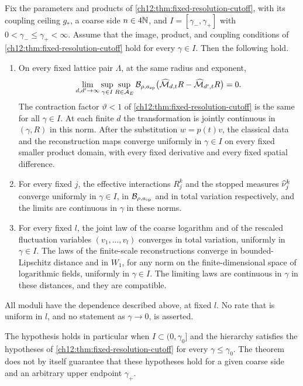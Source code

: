 \begin{theorem}\label{ch12:lem:finite-ceiling-compact-prefixes}\label{ch12:lem:compact-coupling-operators}\label{ch12:thm:compact-coupling-prefixes}
Fix the parameters and products of \cref{ch12:thm:fixed-resolution-cutoff}, with its coupling ceiling $g_*$, a coarse side $n\in4\mathbb N$, and $I=[\gamma_-,\gamma_+]$ with $0<\gamma_-\le\gamma_+<\infty$. Assume that the image, product, and coupling conditions of \cref{ch12:thm:fixed-resolution-cutoff} hold for every $\gamma\in I$. Then the following hold.
\begin{enumerate}
\item On every fixed lattice pair $\Lambda$, at the same radius and exponent,
\begin{equation}\label{ch12:eq:compact-coupling-operator-limit}
 \lim_{d,d'\to\infty}\sup_{\gamma\in I}\sup_{R\in\mathcal A_E}\mathcal B_{\rho,a_{\mathrm{sp}}}\bigl(\widehat{\mathcal M}_{d,t}R-\widehat{\mathcal M}_{d',t}R\bigr)=0 .
\end{equation}
The contraction factor $\vartheta<1$ of \cref{ch12:thm:fixed-resolution-cutoff} is the same for all $\gamma\in I$. At each finite $d$ the transformation is jointly continuous in $(\gamma,R)$ in this norm. After the substitution $w=p(t)v$, the classical data and the reconstruction maps converge uniformly in $\gamma\in I$ on every fixed smaller product domain, with every fixed derivative and every fixed spatial difference.
\item For every fixed $j$, the effective interactions $R_j^k$ and the stopped measures $\widehat\nu_j^k$ converge uniformly in $\gamma\in I$, in $\mathcal B_{\rho,a_{\mathrm{sp}}}$ and in total variation respectively, and the limits are continuous in $\gamma$ in these norms.
\item For every fixed $l$, the joint law of the coarse logarithm and of the rescaled fluctuation variables $(v_1,\ldots,v_l)$ converges in total variation, uniformly in $\gamma\in I$. The laws of the finite-scale reconstructions converge in bounded-Lipschitz distance and in $W_1$, for any norm on the finite-dimensional space of logarithmic fields, uniformly in $\gamma\in I$. The limiting laws are continuous in $\gamma$ in these distances, and they are compatible.
\end{enumerate}
All moduli have the dependence described above, at fixed $l$. No rate that is uniform in $l$, and no statement as $\gamma\to0$, is asserted.
\end{theorem}

The hypothesis holds in particular when $I\subset(0,\gamma_0]$ and the hierarchy satisfies the hypotheses of \cref{ch12:thm:fixed-resolution-cutoff} for every $\gamma\le\gamma_0$. The theorem does not by itself guarantee that these hypotheses hold for a given coarse side and an arbitrary upper endpoint $\gamma_+$.

